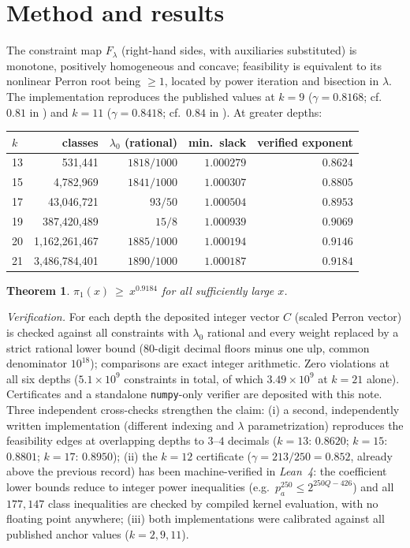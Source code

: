 \documentclass[11pt]{article}
\newtheorem{theorem}{Theorem}
\begin{document}
\section{Method and results}
The constraint map $F_\lambda$ (right-hand sides, with auxiliaries substituted) is monotone,
positively homogeneous and concave; feasibility is equivalent to its nonlinear Perron root
being $\ge 1$, located by power iteration and bisection in $\lambda$. The implementation
reproduces the published values at $k=9$ ($\gamma=0.8168$; cf.\ $0.81$ in \cite{AL}) and
$k=11$ ($\gamma=0.8418$; cf.\ $0.84$ in \cite{KL}). At greater depths:

\begin{center}
\begin{tabular}{lrrrr}
\toprule
$k$ & classes & $\lambda_0$ (rational) & min.\ slack & verified exponent\\
\midrule
13 & 531{,}441 & $1818/1000$ & $1.000279$ & $0.8624$\\
15 & 4{,}782{,}969 & $1841/1000$ & $1.000307$ & $0.8805$\\
17 & 43{,}046{,}721 & $93/50$ & $1.000504$ & $0.8953$\\
19 & 387{,}420{,}489 & $15/8$ & $1.000939$ & $0.9069$\\
20 & 1{,}162{,}261{,}467 & $1885/1000$ & $1.000194$ & $0.9146$\\
21 & 3{,}486{,}784{,}401 & $1890/1000$ & $1.000187$ & $\mathbf{0.9184}$\\
\bottomrule
\end{tabular}
\end{center}

\begin{theorem}
$\pi_1(x)\ \ge\ x^{0.9184}$ for all sufficiently large $x$.
\end{theorem}

\emph{Verification.} For each depth the deposited integer vector $C$ (scaled Perron vector)
is checked against all constraints with $\lambda_0$ rational and every weight replaced by a
strict rational lower bound (80-digit decimal floors minus one ulp, common denominator
$10^{18}$); comparisons are exact integer arithmetic. Zero violations at all six depths
($5.1\times 10^9$ constraints in total, of which $3.49\times 10^9$ at $k=21$ alone). Certificates and a standalone {\tt numpy}-only
verifier are deposited with this note. Three independent cross-checks strengthen the claim:
(i) a second, independently written implementation (different indexing and $\lambda$
parametrization) reproduces the feasibility edges at overlapping depths to $3$--$4$ decimals
($k{=}13$: $0.8620$; $k{=}15$: $0.8801$; $k{=}17$: $0.8950$);
(ii) the $k=12$ certificate ($\gamma = 213/250 = 0.852$, already above the previous record)
has been machine-verified in \emph{Lean~4}: the coefficient lower bounds reduce to integer
power inequalities (e.g.\ $p_a^{250}\le 2^{250Q-426}$) and all $177{,}147$ class inequalities
are checked by compiled kernel evaluation, with no floating point anywhere;
(iii) both implementations were calibrated against all published anchor values
($k=2,9,11$).
\end{document}
